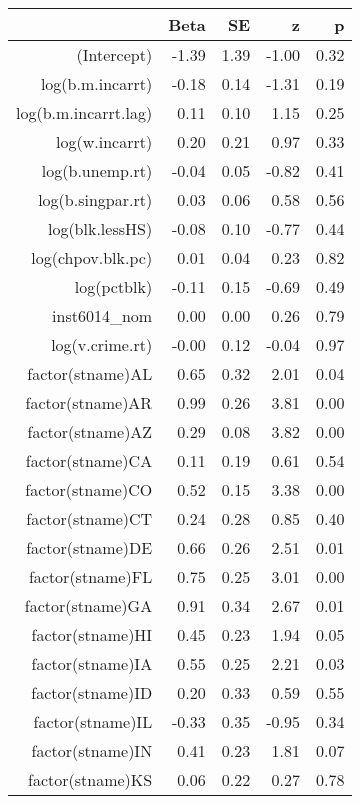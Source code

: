 \begin{table}[ht]
\centering
\begin{tabular}{rrrrr}
  \hline
 & Beta & SE & z & p \\ 
  \hline
(Intercept) & -1.39 & 1.39 & -1.00 & 0.32 \\ 
  log(b.m.incarrt) & -0.18 & 0.14 & -1.31 & 0.19 \\ 
  log(b.m.incarrt.lag) & 0.11 & 0.10 & 1.15 & 0.25 \\ 
  log(w.incarrt) & 0.20 & 0.21 & 0.97 & 0.33 \\ 
  log(b.unemp.rt) & -0.04 & 0.05 & -0.82 & 0.41 \\ 
  log(b.singpar.rt) & 0.03 & 0.06 & 0.58 & 0.56 \\ 
  log(blk.lessHS) & -0.08 & 0.10 & -0.77 & 0.44 \\ 
  log(chpov.blk.pc) & 0.01 & 0.04 & 0.23 & 0.82 \\ 
  log(pctblk) & -0.11 & 0.15 & -0.69 & 0.49 \\ 
  inst6014\_nom & 0.00 & 0.00 & 0.26 & 0.79 \\ 
  log(v.crime.rt) & -0.00 & 0.12 & -0.04 & 0.97 \\ 
  factor(stname)AL & 0.65 & 0.32 & 2.01 & 0.04 \\ 
  factor(stname)AR & 0.99 & 0.26 & 3.81 & 0.00 \\ 
  factor(stname)AZ & 0.29 & 0.08 & 3.82 & 0.00 \\ 
  factor(stname)CA & 0.11 & 0.19 & 0.61 & 0.54 \\ 
  factor(stname)CO & 0.52 & 0.15 & 3.38 & 0.00 \\ 
  factor(stname)CT & 0.24 & 0.28 & 0.85 & 0.40 \\ 
  factor(stname)DE & 0.66 & 0.26 & 2.51 & 0.01 \\ 
  factor(stname)FL & 0.75 & 0.25 & 3.01 & 0.00 \\ 
  factor(stname)GA & 0.91 & 0.34 & 2.67 & 0.01 \\ 
  factor(stname)HI & 0.45 & 0.23 & 1.94 & 0.05 \\ 
  factor(stname)IA & 0.55 & 0.25 & 2.21 & 0.03 \\ 
  factor(stname)ID & 0.20 & 0.33 & 0.59 & 0.55 \\ 
  factor(stname)IL & -0.33 & 0.35 & -0.95 & 0.34 \\ 
  factor(stname)IN & 0.41 & 0.23 & 1.81 & 0.07 \\ 
  factor(stname)KS & 0.06 & 0.22 & 0.27 & 0.78 \\ 

\end{tabular}
\end{table}
